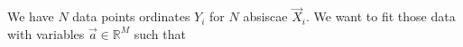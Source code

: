 \documentclass[aps,12pt]{revtex4}
\begin{document}
We have $N$ data points ordinates $Y_i$ for $N$ absiscae $\vec X_i$.
We want to fit those data with variables $\vec a \in \mathbb R^M$
such that
\end{document}
